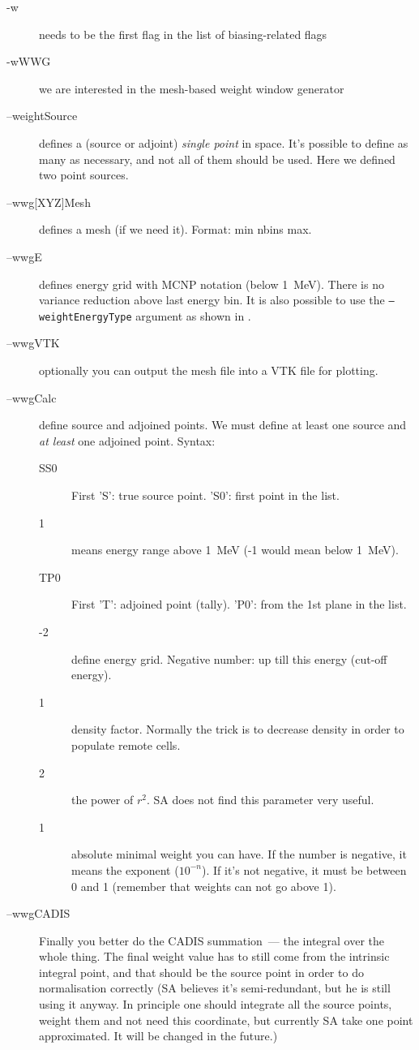 \begin{description}
\item[-w] needs to be the first flag in the list of biasing-related flags
\item[-wWWG] we are interested in the mesh-based weight window generator
\item[--weightSource] defines a (source or adjoint) {\em single point} in space. It's possible to define as many as necessary, and not all of them should be used.
  Here we defined two point sources.
\item[--wwg{[XYZ]}Mesh] defines a mesh (if we need it). Format: min nbins max.
\item[--wwgE] defines energy grid with MCNP notation (below \SI{1}{\mega\electronvolt}). There is no variance reduction above last energy bin.
  It is also possible to use the {\tt --weightEnergyType} argument as shown in .
\item[--wwgVTK] optionally you can output the mesh file into a VTK file for plotting.
\item[--wwgCalc] define source and adjoined points. We must define at least one source and {\em at least} one adjoined point.
  Syntax:
  \begin{description}
  \item[SS0] First 'S': true source point. 'S0': first point in the list.
  \item[1] means energy range above \SI{1}{\mega\electronvolt} (-1 would mean below \SI{1}{\mega\electronvolt}).
  \item[TP0] First 'T': adjoined point (tally). 'P0': from the 1st plane in the list.
  \item[-2] define energy grid. Negative number: up till this energy (cut-off energy).
  \item[1] density factor. Normally the trick is to decrease density in order to populate remote cells.
  \item[2] the power of $r^2$. SA does not find this parameter very useful.
  \item[1] absolute minimal weight you can have. If the number is negative, it means the exponent ($10^{-n}$). If it's not negative, it must be between 0 and 1 (remember that weights can not go above 1).
  \end{description}
\item[--wwgCADIS] Finally you better do the CADIS summation~--- the integral over the whole thing. The final weight value has to still
  come from the intrinsic integral point, and that should be the source point in order to do normalisation correctly (SA believes it's semi-redundant, but he is still using it anyway. In principle one should integrate all the source points, weight them and not need this coordinate, but currently SA take one point approximated. It will be changed in the future.)
\end{description}

